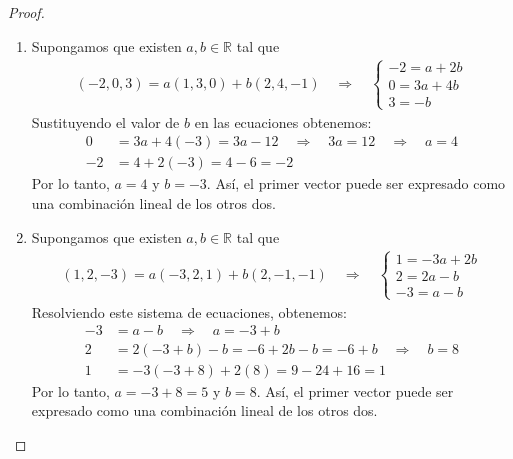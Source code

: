 \documentclass[11pt,letterpaper]{article}
\newcommand{\R}{\mathbb{R}}
\begin{document}
\begin{proof}
    \begin{enumerate}
        \item Supongamos que existen $a,b\in \R$ tal que
        \begin{align*}
            (-2,0,3)=a(1,3,0)+b(2,4,-1) \quad \Rightarrow \quad
            \begin{cases}
                -2=a+2b \\
                0=3a+4b \\
                3=-b
            \end{cases}
        \end{align*}
    Sustituyendo el valor de $b$ en las ecuaciones obtenemos:
    \begin{align*}
        0 &= 3a + 4(-3) = 3a - 12 \quad \Rightarrow \quad 3a = 12 \quad \Rightarrow \quad a = 4 \\
        -2 &= 4 + 2(-3) = 4 - 6 = -2
    \end{align*}
    Por lo tanto, $a = 4$ y $b = -3$. Así, el primer vector puede ser expresado como una combinación lineal de los otros dos.

    \item Supongamos que existen $a,b\in \R$ tal que
    \begin{align*}
        (1,2,-3)=a(-3,2,1)+b(2,-1,-1) \quad \Rightarrow \quad
        \begin{cases}
            1=-3a+2b \\
            2=2a-b \\
            -3=a-b
        \end{cases}
    \end{align*}
    Resolviendo este sistema de ecuaciones, obtenemos:
    \begin{align*}
        -3 &= a - b \quad \Rightarrow \quad a = -3 + b \\
        2 &= 2(-3 + b) - b = -6 + 2b - b = -6 + b \quad \Rightarrow \quad b = 8 \\
        1 &= -3(-3 + 8) + 2(8) = 9 - 24 + 16 = 1
    \end{align*}
    Por lo tanto, $a = -3 + 8 = 5$ y $b = 8$. Así, el primer vector puede ser expresado como una combinación lineal de los otros dos.


\end{enumerate}
\end{proof}
\end{document}
